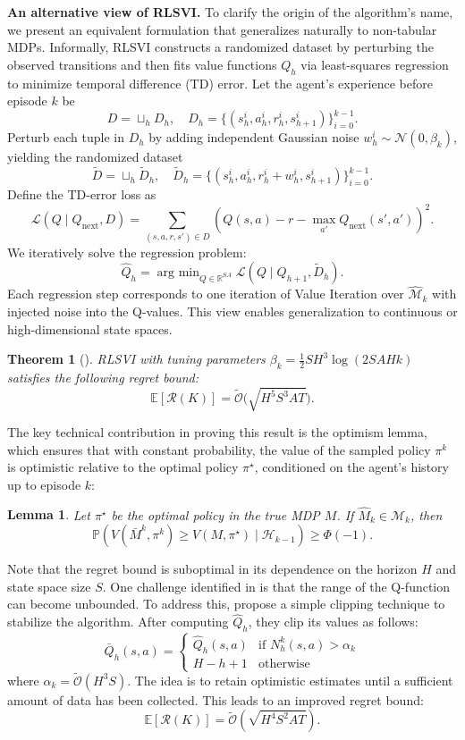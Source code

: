 \documentclass{article}
\numberwithin{equation}{section}
\newtheorem{theorem}{Theorem}
\newtheorem{lemma}{Lemma}
\DeclareMathOperator*{\argmin}{arg\ min}
\begin{document}
\textbf{An alternative view of RLSVI.} To clarify the origin of the algorithm's name, we present an equivalent formulation that generalizes naturally to non-tabular MDPs. Informally, RLSVI constructs a randomized dataset by perturbing the observed transitions and then fits value functions \(Q_h\) via least-squares regression to minimize temporal difference (TD) error. Let the agent's experience before episode \(k\) be
\[
D = \sqcup_h D_h, \quad D_h = \{(s_h^i, a_h^i, r_h^i, s_{h+1}^i)\}_{i=0}^{k-1}.
\]
Perturb each tuple in \(D_h\) by adding independent Gaussian noise \(w_h^i \sim \mathcal{N}(0, \beta_k)\), yielding the randomized dataset
\[
\widetilde{D} = \sqcup_h \widetilde{D}_h, \quad \widetilde{D}_h = \{(s_h^i, a_h^i, r_h^i + w_h^i, s_{h+1}^i)\}_{i=0}^{k-1}.
\]
Define the TD-error loss as
\[
\mathcal{L}(Q \mid Q_{\text{next}}, {D}) = \sum_{(s,a,r,s') \in {D}} \left(Q(s,a) - r - \max_{a'} Q_{\text{next}}(s', a')\right)^2.
\]
We iteratively solve the regression problem:
\[
\widehat{Q}_h = \argmin_{Q \in \mathbb{R}^{SA}} \mathcal{L}(Q \mid Q_{h+1}, \widetilde{D}_h).
\]
Each regression step corresponds to one iteration of Value Iteration over \(\widehat{\mathcal{M}}_k\) with injected noise into the Q-values. This view enables generalization to continuous or high-dimensional state spaces.
\begin{theorem}[\cite{russo2019worst}]
    RLSVI with tuning parameters \(\beta_k = \frac{1}{2}SH^3\log(2SAHk)\) satisfies the following regret bound:
    \[
        \mathbb{E}[\mathcal{R}(K)] = \widetilde{\mathcal{O}}\big(\sqrt{H^5S^3AT}\big).
    \]
\end{theorem}

The key technical contribution in proving this result is the optimism lemma, which ensures that with constant probability, the value of the sampled policy \(\pi^k\) is optimistic relative to the optimal policy \(\pi^{\star}\), conditioned on the agent's history up to episode \(k\):
\begin{lemma}
    Let \(\pi^{\star}\) be the optimal policy in the true MDP \(M\). If \(\widehat{M}_k \in \mathcal{M}_k\), then
    \[
        \mathbb{P}\left(V(\bar{M}^k, \pi^k) \geq V(M, \pi^{\star}) \mid \mathcal{H}_{k-1}\right) \geq \Phi(-1).
    \]
\end{lemma}

Note that the regret bound is suboptimal in its dependence on the horizon \(H\) and state space size \(S\). One challenge identified in \cite{russo2019worst} is that the range of the Q-function can become unbounded. To address this, \citet{agrawal2021improved} propose a simple clipping technique to stabilize the algorithm. After computing \(\widehat{Q}_h\), they clip its values as follows:
\[
\bar{Q}_{h}(s,a) = 
\begin{cases}
    \widehat{Q}_h(s,a) & \text{if } N_h^k(s,a) > \alpha_k \\
    H - h + 1 & \text{otherwise}
\end{cases}
\]
where \(\alpha_k = \widetilde{\mathcal{O}}(H^3 S)\). The idea is to retain optimistic estimates until a sufficient amount of data has been collected. This leads to an improved regret bound:
\[
    \mathbb{E}[\mathcal{R}(K)] = \widetilde{\mathcal{O}}(  \sqrt{H^4S^2AT}).
\]
\end{document}

